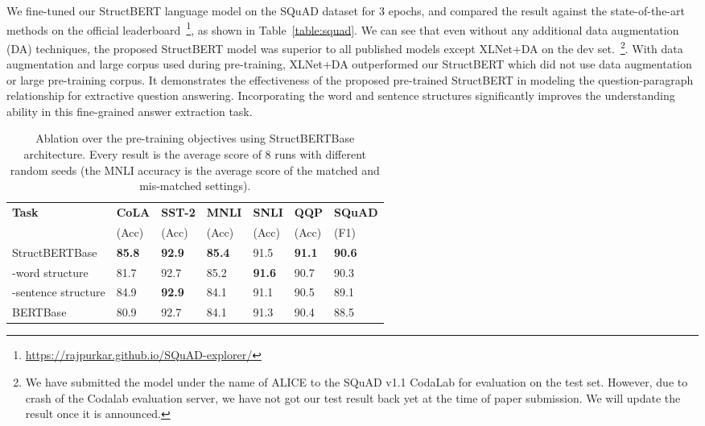 \documentclass{article}
\begin{document}
We fine-tuned our StructBERT language model on the SQuAD dataset for 3 epochs, and compared the result against the state-of-the-art methods on the official leaderboard~\footnote{\small{\url{https://rajpurkar.github.io/SQuAD-explorer/}}}, as shown in Table~\ref{table:squad}. We can see that even without any additional data augmentation (DA) techniques, the proposed StructBERT model was superior to all published models except XLNet+DA on the dev set.~\footnote{\small{We have submitted the model under the name of ALICE to the SQuAD v1.1 CodaLab for evaluation on the test set. However, due to crash of the Codalab evaluation server, we have not got our test result back yet at the time of paper submission. We will update the result once it is announced.}}. With data augmentation and large corpus used during pre-training, XLNet+DA outperformed our StructBERT which did not use data augmentation or large pre-training corpus. It demonstrates the effectiveness of the proposed pre-trained StructBERT in modeling the question-paragraph relationship for extractive question answering. Incorporating the word and sentence structures significantly improves the understanding ability in this fine-grained answer extraction task.

\begin{table*}[t]
\centering
\begin{tabular}{l|l|l|l|l|l|l}
\hline
\bf Task & \bf CoLA & \bf SST-2 & \bf MNLI & \bf SNLI & \bf QQP & \bf SQuAD \\
 & (Acc) & (Acc) & (Acc) & (Acc) & (Acc) & (F1) \\
 \hline
 StructBERT{\small Base} & {\bf 85.8} &  {\bf 92.9} &	{\bf 85.4} &	91.5 &	{\bf 91.1} &	{\bf 90.6} \\
 -word structure &	81.7 &	92.7  &	85.2 &	{\bf 91.6} &	90.7 &	90.3 \\
 -sentence structure &	84.9 & {\bf 92.9} &	84.1 &	91.1 &	90.5 &	89.1 \\
 BERT{\small Base} &	80.9 & 92.7 &	84.1 &	91.3 &	90.4 &	88.5 \\
 \hline 

\end{tabular}
\caption{Ablation over the pre-training objectives using StructBERT{\small Base} architecture. Every result is the average score of 8 runs with different random seeds (the MNLI accuracy is the average score of the matched and mis-matched settings).
  }
\label{table:ablation}
\end{table*}
\end{document}
